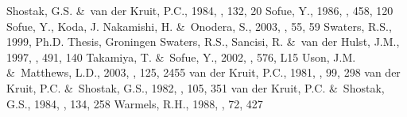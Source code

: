 \documentclass[traditabstract]{aa} %
\begin{document}
\begin{thebibliography}{}
Shostak, G.S. \&\ van der Kruit, P.C., 1984, \aap, 132, 20 
Sofue, Y., 1986, \apj, 458, 120
Sofue, Y., Koda, J. Nakamishi, H. \&\ Onodera, S., 2003, \pasj, 55, 59
Swaters, R.S., 1999, Ph.D. Thesis, Groningen
Swaters, R.S., Sancisi, R. \&\ van der Hulst, J.M., 1997, \apj, 491, 140
Takamiya, T. \&\ Sofue, Y., 2002, \apj, 576, L15
Uson, J.M. \&\ Matthews, L.D., 2003, \aj, 125, 2455
van der Kruit, P.C., 1981, \aap, 99, 298
van der Kruit, P.C. \&\ Shostak, G.S., 1982, \aap, 105, 351
van der Kruit, P.C. \&\ Shostak, G.S., 1984, \aap, 134, 258
Warmels, R.H., 1988, \aaps, 72, 427
\end{thebibliography}
\end{document}
